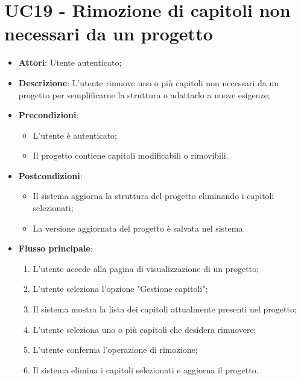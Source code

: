 \section*{UC19 - Rimozione di capitoli non necessari da un progetto}
\begin{itemize}
    \item \textbf{Attori}: Utente autenticato;
    \item \textbf{Descrizione}: L'utente rimuove uno o più capitoli non necessari da un progetto per semplificarne la struttura o adattarlo a nuove esigenze;
    \item \textbf{Precondizioni}: 
    \begin{itemize}
        \item L'utente è autenticato;
        \item Il progetto contiene capitoli modificabili o rimovibili.
    \end{itemize}
    \item \textbf{Postcondizioni}: 
    \begin{itemize}
        \item Il sistema aggiorna la struttura del progetto eliminando i capitoli selezionati;
        \item La versione aggiornata del progetto è salvata nel sistema.
    \end{itemize}
    \item \textbf{Flusso principale}:
    \begin{enumerate}
        \item L'utente accede alla pagina di visualizzazione di un progetto;
        \item L'utente seleziona l'opzione "Gestione capitoli";
        \item Il sistema mostra la lista dei capitoli attualmente presenti nel progetto;
        \item L'utente seleziona uno o più capitoli che desidera rimuovere;
        \item L'utente conferma l'operazione di rimozione;
        \item Il sistema elimina i capitoli selezionati e aggiorna il progetto.
    \end{enumerate}
\end{itemize}